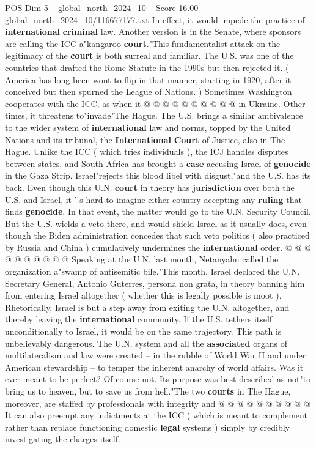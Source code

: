 \begin{textsample}{POS Dim 5 – global\_north\_2024\_10 – Score 16.00 – global\_north\_2024\_10/116677177.txt}
In effect, it would impede the practice of \textbf{international} \textbf{criminal} law.
Another version is in the Senate, where sponsors are calling the ICC a"kangaroo \textbf{court}."This fundamentalist attack on the legitimacy of the \textbf{court} is both surreal and familiar.
The U.S. was one of the countries that drafted the Rome Statute in the 1990s but then rejected it. ( America has long been wont to flip in that manner, starting in 1920, after it conceived but then spurned the League of Nations. ) Sometimes Washington cooperates with the ICC, as when it @ @ @ @ @ @ @ @ @ @ in Ukraine.
Other times, it threatens to"invade"The Hague.
The U.S. brings a similar ambivalence to the wider system of \textbf{international} law and norms, topped by the United Nations and its tribunal, the \textbf{International} \textbf{Court} of Justice, also in The Hague.
Unlike the ICC ( which tries individuals ), the ICJ handles disputes between states, and South Africa has brought a \textbf{case} accusing Israel of \textbf{genocide} in the Gaza Strip.
Israel"rejects this blood libel with disgust,"and the U.S. has its back.
Even though this U.N. \textbf{court} in theory has \textbf{jurisdiction} over both the U.S. and Israel, it ' s hard to imagine either country accepting any \textbf{ruling} that finds \textbf{genocide}.
In that event, the matter would go to the U.N.
Security Council.
But the U.S. wields a veto there, and would shield Israel as it usually does, even though the Biden administration concedes that such veto politics ( also practiced by Russia and China ) cumulatively undermines the \textbf{international} order. @ @ @ @ @ @ @ @ @ @ Speaking at the U.N. last month, Netanyahu called the organization a"swamp of antisemitic bile."This month, Israel declared the U.N.
Secretary General, Antonio Guterres, persona non grata, in theory banning him from entering Israel altogether ( whether this is legally possible is moot ).
Rhetorically, Israel is but a step away from exiting the U.N. altogether, and thereby leaving the \textbf{international} community.
If the U.S. tethers itself unconditionally to Israel, it would be on the same trajectory.
This path is unbelievably dangerous.
The U.N. system and all the \textbf{associated} organs of multilateralism and law were created -- in the rubble of World War II and under American stewardship -- to temper the inherent anarchy of world affairs.
Was it ever meant to be perfect?
Of course not.
Its purpose was best described as not"to bring us to heaven, but to save us from hell."The two \textbf{courts} in The Hague, moreover, are staffed by professionals with integrity and @ @ @ @ @ @ @ @ @ @ It can also preempt any indictments at the ICC ( which is meant to complement rather than replace functioning domestic \textbf{legal} systems ) simply by credibly investigating the charges itself.

\end{textsample}
